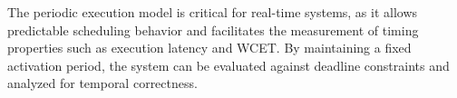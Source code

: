 \documentclass[conference]{IEEEtran}
\begin{document}

The periodic execution model is critical for real-time systems, as it allows predictable scheduling behavior and facilitates the
measurement of timing properties such as execution latency and WCET. By maintaining a fixed
activation period, the system can be evaluated against deadline constraints and analyzed for temporal correctness.
\end{document}
